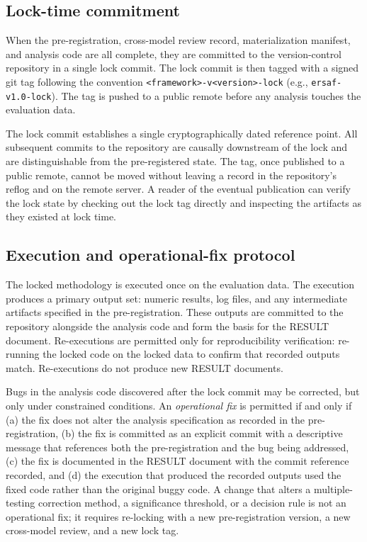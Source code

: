 \documentclass[11pt]{article}
\begin{document}
\subsection{Lock-time commitment}
\label{subsec:lock-commit}

When the pre-registration, cross-model review record, materialization
manifest, and analysis code are all complete, they are committed to
the version-control repository in a single lock commit. The lock
commit is then tagged with a signed git tag following the convention
\texttt{<framework>-v<version>-lock} (e.g., \texttt{ersaf-v1.0-lock}).
The tag is pushed to a public remote before any analysis touches the
evaluation data.

The lock commit establishes a single cryptographically dated reference
point. All subsequent commits to the repository are causally
downstream of the lock and are distinguishable from the pre-registered
state. The tag, once published to a public remote, cannot be moved
without leaving a record in the repository's reflog and on the remote
server. A reader of the eventual publication can verify the lock
state by checking out the lock tag directly and inspecting the
artifacts as they existed at lock time.

\subsection{Execution and operational-fix protocol}
\label{subsec:execution}

The locked methodology is executed once on the evaluation data. The
execution produces a primary output set: numeric results, log files,
and any intermediate artifacts specified in the pre-registration.
These outputs are committed to the repository alongside the analysis
code and form the basis for the RESULT document. Re-executions are
permitted only for reproducibility verification: re-running the
locked code on the locked data to confirm that recorded outputs
match. Re-executions do not produce new RESULT documents.

Bugs in the analysis code discovered after the lock commit may be
corrected, but only under constrained conditions. An
\emph{operational fix} is permitted if and only if (a) the fix does
not alter the analysis specification as recorded in the
pre-registration, (b) the fix is committed as an explicit commit
with a descriptive message that references both the pre-registration
and the bug being addressed, (c) the fix is documented in the RESULT
document with the commit reference recorded, and (d) the execution
that produced the recorded outputs used the fixed code rather than
the original buggy code. A change that alters a multiple-testing
correction method, a significance threshold, or a decision rule is
not an operational fix; it requires re-locking with a new
pre-registration version, a new cross-model review, and a new lock
tag.
\end{document}
